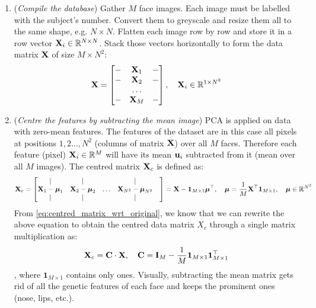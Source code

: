 \documentclass[a4paper]{article}
\begin{document}
\begin{enumerate}
	\item (\textit{Compile the database}) Gather $M$ face images. Each image must be labelled with the subject's number.
	Convert them to greyscale and resize them all to the same shape, e.g. $N\times N$. Flatten each image row by row and store it in a row vector $\textbf{X}_i \in \mathbb{R}^{N\times N}$.
			Stack those vectors horizontally to form the data matrix $\textbf{X}$ of size $M\times N^2$:
			\begin{equation}
				\textbf{X} = 
				\begin{bmatrix}
					- & \textbf{X}_1 & - \\	
					- & \textbf{X}_2 & - \\	
					 & \ldots & \\
					- & \textbf{X}_M & - \\	
				\end{bmatrix}, \quad \textbf{X}_i \in \mathbb{R}^{1\times N^2}
			\end{equation}
		
\item (\textit{Centre the features by subtracting the mean image}) PCA is applied on data with zero-mean features. The features of the dataset are in this case all pixels at positions $1,2\ldots,N^2$ (columns of matrix $\textbf{X}$) over all $M$ faces. Therefore each feature (pixel) $\textbf{X}_i\in \mathbb{R}^M$ will have its mean $\textbf{u}_i$ subtracted from it (mean over all $M$ images). The centred matrix $\textbf{X}_c$ is defined as:
	\[
		\textbf{X}_c =  \begin{bmatrix}
			| & | &  & | \\
			\textbf{X}_1 -	\boldsymbol{\mu}_1 & \textbf{X}_2 -	\boldsymbol{\mu}_2 &\ldots &\textbf{X}_{N^2} -	\boldsymbol{\mu}_{N^2} &\\
			| & | &  & | 
		\end{bmatrix} = \textbf{X} - \textbf{1}_{M\times 1}\boldsymbol{\mu}^{\top}, \quad
		\boldsymbol{\mu} = \frac{1}{M} \textbf{X}^{\top} \textbf{1}_{M\times 1}, \quad \boldsymbol{\mu}\in\mathbb{R}^{N^2}
	\]
	From \eqref{eq:centred_matrix_wrt_original}, we know that we can rewrite the above equation to obtain the centred data matrix $X_c$ through a single matrix multiplication as:
		\begin{equation}
			\textbf{X}_c = \textbf{C}\cdot \textbf{X}, \quad \textbf{C} = \textbf{I}_M - \frac{1}{M}\textbf{1}_{M\times 1}\textbf{1}_{M\times 1}^{\top} 
		\end{equation}
		, where $\textbf{1}_{M\times 1}$ contains only ones. Visually, subtracting the mean matrix gets rid of all the genetic features of each face and keeps the prominent ones (nose, lips, etc.). 


\end{enumerate}
\end{document}
